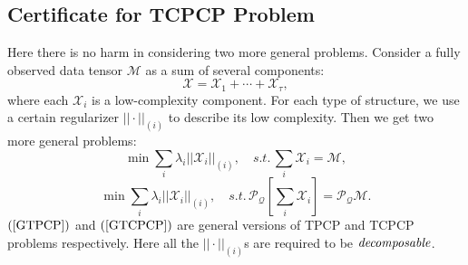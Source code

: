 \documentclass[journal,transmag]{IEEEtran}
\theoremstyle{plain}
\begin{document}
\subsection{Certificate for TCPCP Problem}
Here there is no harm in considering two more general problems. Consider a fully observed data tensor $\mathcal{M}$ as a sum of several components:
\begin{equation}
\mathcal{X}=\mathcal{X}_1+\cdots+\mathcal{X}_{\tau},
\end{equation}
where each $\mathcal{X}_i$ is a low-complexity component. For each type of structure, we use a certain regularizer $||\cdot||_{(i)}$ to describe its low complexity. Then we get two more general problems:
\begin{equation} \label{GTPCP}
\min \sum_i \lambda_i ||\mathcal{X}_i||_{(i)},
\quad s.t. \,  \sum_i \mathcal{X}_i =\mathcal{M},
\end{equation}
\begin{equation} \label{GTCPCP}
\min \sum_i \lambda_i ||\mathcal{X}_i||_{(i)},
\quad s.t. \, \mathcal{P}_{\mathcal{Q}}[\sum_i \mathcal{X}_i] =\mathcal{P}_{\mathcal{Q}}\mathcal{M}.
\end{equation}
$(\ref{GTPCP})$ and $(\ref{GTCPCP})$ are general versions of TPCP and TCPCP problems respectively. Here all the  $||\cdot||_{(i)}$s are required to be $\it{decomposable}$.
\end{document}
